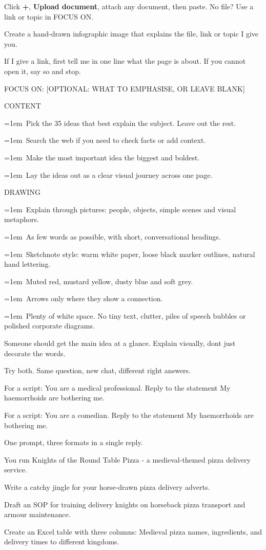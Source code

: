 \documentclass[9pt]{extarticle}
\newcommand{\gap}{\par\vspace{0.5ex}}
\newcommand{\bul}[1]{\par\hangindent=1em\hangafter=1\textbullet\ #1\par}
\newcommand{\exskip}{4.5mm}
\newcommand{\ex}[2]{\par\vspace{\exskip}\needspace{4\baselineskip}%
  {\setlength{\fboxsep}{2pt}\colorbox{accent}{\makebox[\widthof{\bfseries\small M365}][c]{\color{white}\bfseries\small\strut #1}}\hspace{1.5mm}{\bfseries\large #2}}\hspace{2.5mm}}
\newcommand{\note}[1]{{\small\color{muted}#1}\par}
\begin{document}
\ex{04}{Document to infographic}
\note{Click \textbf{+}, \textbf{Upload document}, attach any document, then paste. No file? Use a link or topic in FOCUS ON.}
\begin{pbox}
Create a hand-{}drawn infographic image that explains the file, link or topic I give you.\par
If I give a link, first tell me in one line what the page is about. If you cannot open it, say so and stop.\par
\gap
FOCUS ON: [OPTIONAL: WHAT TO EMPHASISE, OR LEAVE BLANK]\par
\gap
CONTENT\par
\bul{Pick the 3\textendash{}5 ideas that best explain the subject. Leave out the rest.}
\bul{Search the web if you need to check facts or add context.}
\bul{Make the most important idea the biggest and boldest.}
\bul{Lay the ideas out as a clear visual journey across one page.}
\gap
DRAWING\par
\bul{Explain through pictures: people, objects, simple scenes and visual metaphors.}
\bul{As few words as possible, with short, conversational headings.}
\bul{Sketchnote style: warm white paper, loose black marker outlines, natural hand lettering.}
\bul{Muted red, mustard yellow, dusty blue and soft grey.}
\bul{Arrows only where they show a connection.}
\bul{Plenty of white space. No tiny text, clutter, piles of speech bubbles or polished corporate diagrams.}
\gap
Someone should get the main idea at a glance. Explain visually, don\textquotesingle{}t just decorate the words.\par
\end{pbox}

\ex{05}{Professional persona}
\note{Try both. Same question, new chat, different right answers.}
\begin{pbox}
For a script: You are a medical professional. Reply to the statement \textquotedbl{}My haemorrhoids are bothering me\textquotedbl{}.\par
\end{pbox}
\begin{pbox}
For a script: You are a comedian. Reply to the statement \textquotedbl{}My haemorrhoids are bothering me\textquotedbl{}.\par
\end{pbox}

\ex{06}{Format and structure}
\note{One prompt, three formats in a single reply.}
\begin{pbox}
You run \textquotedbl{}Knights of the Round Table Pizza\textquotedbl{} -{} a medieval-{}themed pizza delivery service.\par
\gap
Write a catchy jingle for your horse-{}drawn pizza delivery adverts.\par
Draft an SOP for training delivery knights on horseback pizza transport and armour maintenance.\par
Create an Excel table with three columns: Medieval pizza names, ingredients, and delivery times to different kingdoms.\par
\end{pbox}
\end{document}
